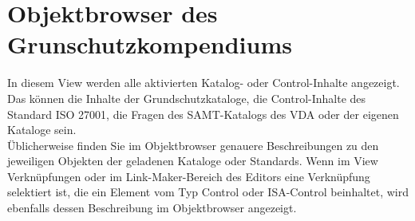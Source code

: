 \documentclass[a4paper,10pt]{book}
\begin{document}
\section{Objektbrowser des Grunschutzkompendiums}
In diesem View werden alle aktivierten Katalog- oder Control-Inhalte angezeigt. Das können die Inhalte der Grundschutzkataloge, die Control-Inhalte des
Standard ISO 27001, die Fragen des SAMT-Katalogs des VDA oder der eigenen Kataloge sein.
\newline\\
Üblicherweise finden Sie im Objektbrowser genauere Beschreibungen zu den jeweiligen Objekten der geladenen Kataloge oder Standards. Wenn im View Verknüpfungen
oder im Link-Maker-Bereich des Editors eine Verknüpfung selektiert ist, die ein Element vom Typ Control oder ISA-Control beinhaltet, wird ebenfalls dessen
Beschreibung im Objektbrowser angezeigt.
\end{document}
